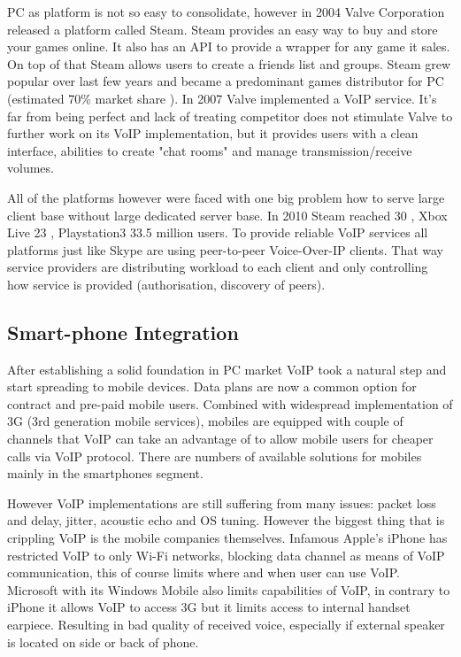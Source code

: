 PC as platform is not so easy to consolidate, however in 2004 Valve Corporation released a platform called Steam. Steam provides an easy way to buy and store your games online. It also has an API to provide a wrapper for any game it sales. On top of that Steam allows users to create a friends list and groups. Steam grew popular over last few years and became a predominant games distributor for PC (estimated 70\% market share \cite{steam_market_share}). In 2007 Valve implemented a VoIP service. It's far from being perfect and lack of treating competitor does not stimulate Valve to further work on its VoIP implementation, but it provides users with a clean interface, abilities to create "chat rooms" and manage transmission/receive volumes.

All of the platforms however were faced with one big problem how to serve large client base without large dedicated server base. In 2010 Steam reached 30  \cite{website:steam_growth}, Xbox Live 23  \cite{xbox_live_market}, Playstation3 33.5 \cite{website:ps3_marketshare} million users. To provide reliable VoIP services all platforms just like Skype are using peer-to-peer Voice-Over-IP clients. That way service providers are distributing workload to each client and only controlling how service is provided (authorisation, discovery of peers).

\subsection{Smart-phone Integration}

After establishing a solid foundation in PC market VoIP took a natural step and start spreading to mobile devices. Data plans are now a common option for contract and pre-paid mobile users. Combined with widespread implementation of 3G (3rd generation mobile services), mobiles are equipped with couple of channels that VoIP can take an advantage of to allow mobile users for cheaper calls via VoIP protocol. There are numbers of available solutions for mobiles mainly in the smartphones segment.

However VoIP implementations are still suffering from many issues: packet loss and delay, jitter, acoustic echo and OS tuning. However the biggest thing that is crippling VoIP is the mobile companies themselves. Infamous Apple's iPhone has restricted VoIP to only Wi-Fi networks, blocking data channel as means of VoIP communication, this of course limits where and when user can use VoIP. Microsoft with its Windows Mobile also limits capabilities of VoIP, in contrary to iPhone it allows VoIP to access 3G but it limits access to internal handset earpiece. Resulting in bad quality of received voice, especially if external speaker is located on side or back of phone\cite{website:voip_cripling_by_apple}.

